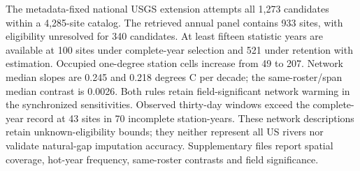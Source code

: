 The metadata-fixed national USGS extension attempts all 1,273 candidates within a 4,285-site catalog. The retrieved annual panel contains 933 sites, with eligibility unresolved for 340 candidates. At least fifteen statistic years are available at 100 sites under complete-year selection and 521 under retention with estimation. Occupied one-degree station cells increase from 49 to 207. Network median slopes are 0.245 and 0.218 degrees C per decade; the same-roster/span median contrast is 0.0026. Both rules retain field-significant network warming in the synchronized sensitivities. Observed thirty-day windows exceed the complete-year record at 43 sites in 70 incomplete station-years. These network descriptions retain unknown-eligibility bounds; they neither represent all US rivers nor validate natural-gap imputation accuracy. Supplementary files report spatial coverage, hot-year frequency, same-roster contrasts and field significance.
